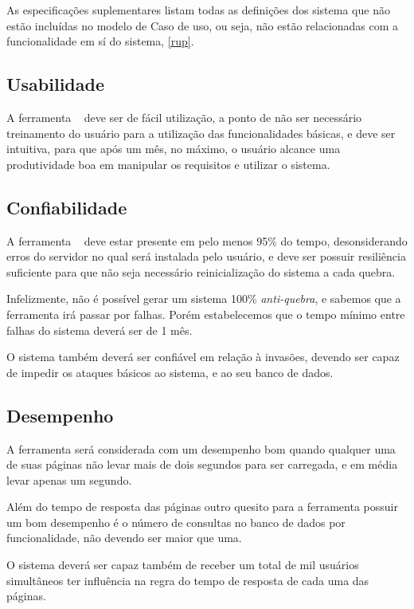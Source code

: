 As especificações suplementares listam todas as definições dos sistema que não estão incluídas no modelo de Caso de uso, ou seja, não estão relacionadas com a funcionalidade em sí do sistema, \ref{rup}.

\subsection{Usabilidade}
	
	A ferramenta \nomeFerramenta~ deve ser de fácil utilização, a ponto de não ser necessário treinamento do usuário para a utilização das funcionalidades básicas, e deve ser intuitiva, para que após um mês, no máximo, o usuário alcance uma produtividade boa em manipular os requisitos e utilizar o sistema.

\subsection{Confiabilidade}

	A ferramenta \nomeFerramenta~ deve estar presente em pelo menos 95\% do tempo, desonsiderando erros do servidor no qual será instalada pelo usuário, e deve ser possuir resiliência suficiente para que não seja necessário reinicialização do sistema a cada quebra.

	Infelizmente, não é possível gerar um sistema 100\% \textit{anti-quebra}, e sabemos que a ferramenta irá passar por falhas. Porém estabelecemos que o tempo mínimo entre falhas do sistema deverá ser de 1 mês.

	O sistema também deverá ser confiável em relação à invasões, devendo ser capaz de impedir os ataques básicos ao sistema, e ao seu banco de dados.

\subsection{Desempenho}

	A ferramenta será considerada com um desempenho bom quando qualquer uma de suas páginas não levar mais de dois segundos para ser carregada, e em média levar apenas um segundo.

	Além do tempo de resposta das páginas outro quesito para a ferramenta possuir um bom desempenho é o número de consultas no banco de dados por funcionalidade, não devendo ser maior que uma.

	O sistema deverá ser capaz também de receber um total de mil usuários simultâneos ter influência na regra do tempo de resposta de cada uma das páginas.